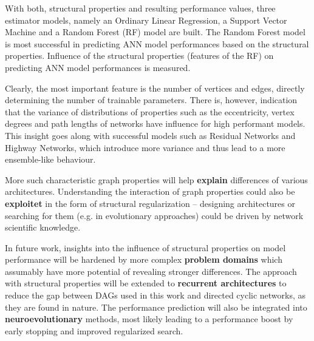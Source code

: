 \documentclass[runningheads]{llncs}
\newcommand{\contentPath}{./}
\newcommand{\imagePath}{./}
\begin{document}
With both, structural properties and resulting performance values, three estimator models, namely an Ordinary Linear Regression, a Support Vector Machine and a Random Forest (RF) model are built.
The Random Forest model is most successful in predicting ANN model performances based on the structural properties.
Influence of the structural properties (features of the RF) on predicting ANN model performances is measured.

Clearly, the most important feature is the number of vertices and edges, directly determining the number of trainable parameters.
There is, however, indication that the variance of distributions of properties such as the eccentricity, vertex degrees and path lengths of networks have influence for high performant models.
This insight goes along with successful models such as Residual Networks and Highway Networks, which introduce more variance and thus lead to a more ensemble-like behaviour.

More such characteristic graph properties will help \textbf{explain} differences of various architectures.
Understanding the interaction of graph properties could also be \textbf{exploitet} in the form of structural regularization -- designing architectures or searching for them (e.g. in evolutionary approaches) could be driven by network scientific knowledge.

In future work, insights into the influence of structural properties on model performance will be hardened by more complex \textbf{problem domains} which assumably have more potential of revealing stronger differences.
The approach with structural properties will be extended to \textbf{recurrent architectures} to reduce the gap between DAGs used in this work and directed cyclic networks, as they are found in nature.
The performance prediction will also be integrated into \textbf{neuroevolutionary} methods, most likely leading to a performance boost by early stopping and improved regularized search.







\newpage
\appendix

\begin{figure}[tb]
	\hfill
	\caption{}
\end{figure}
\end{document}
